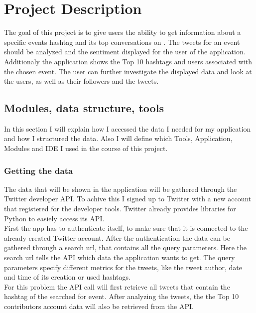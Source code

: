 \documentclass[a4paper,oneside,11pt]{scrreprt}
\begin{document}



\newpage


\chapter{Project Description}
The goal of this project is to give users the ability to get information about a specific events hashtag and its top conversations on . The tweets for an event should be analyzed and the sentiment displayed for the user of the application. Additionaly the application shows the Top 10 hashtags and users associated with the chosen event. The user can further investigate the displayed data and look at the users, as well as their followers and the tweets.

\section{Modules, data structure, tools}

In this section I will explain how I accessed the data I needed for my application and how I structured the data. Also I will define which Tools, Application, Modules and IDE I used in the course of this project.

\subsection{Getting the data}

The data that will be shown in the application will be gathered through the Twitter developer API. To achive this I signed up to Twitter with a new account that registered for the developer tools. Twitter already provides libraries for Python to easiely access its API.\\

First the app has to authenticate itself, to make sure that it is connected to the already created Twitter account. After the authentication the data can be gathered through a search url, that contains all the query parameters. Here the search url tells the API which data the application wants to get. The query parameters specify different metrics for the tweets, like the tweet author, date and time of its creation or used hashtags.\\

For this problem the API call will first retrieve all tweets that contain the hashtag of the searched for event. After analyzing the tweets, the the Top 10 contributors account data will also be retrieved from the API.
\end{document}
